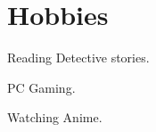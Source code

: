 \documentclass[]{deedy-resume-openfont}
\begin{document}
\begin{minipage}[t]{0.66\textwidth}
\section{Hobbies}
\vspace{\topsep}    %
\begin{tightemize}
\item Reading Detective stories.
\item PC Gaming.
\item Watching Anime.
\end{tightemize}

\end{minipage} 
\end{document}
